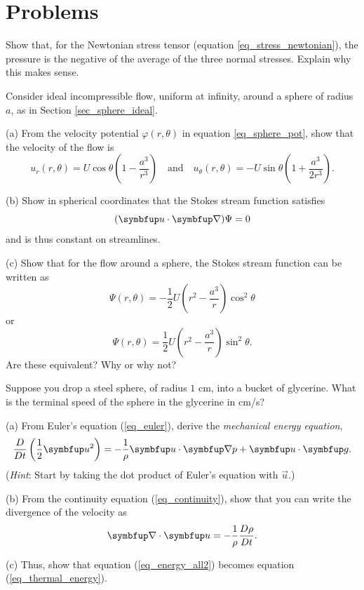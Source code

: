 \section*{Problems}
%

\begin{problem}
\label{prob_pressure} 
Show that, for the Newtonian stress tensor (equation \ref{eq_stress_newtonian}), the pressure is the negative of the average of the three normal stresses.  Explain why this makes sense.
\end{problem}

\begin{problem}
\label{prob_sphere} 
Consider ideal incompressible flow, uniform at infinity, around a sphere of radius $a$, as in Section \ref{sec_sphere_ideal}.

(a) From the velocity potential $\varphi(r, \theta)$ in equation \ref{eq_sphere_pot}, show that the velocity of the flow is
\[
u_r (r, \theta) = U \cos \theta \left( 1 - \frac{a^3}{r^3} \right) \quad \text{and} \quad u_\theta(r, \theta) = -U \sin \theta \left( 1 + \frac{a^3}{2r^3} \right).
\]

(b) Show in spherical coordinates that the Stokes stream function satisfies
\[
(\vec{u} \cdot \grad) \Psi = 0
\]
and is thus constant on streamlines.

(c) Show that for the flow around a sphere, the Stokes stream function can be written as
\[
\Psi (r, \theta) = -\frac{1}{2} U \left( r^2 - \frac{a^3}{r} \right) \cos^2 \theta
\]
or
\[
\Psi (r, \theta) = \frac{1}{2} U \left( r^2 - \frac{a^3}{r} \right) \sin^2 \theta.
\]
Are these equivalent?  Why or why not?
\end{problem}



\begin{problem}
\label{prob_terminal_vel} 
Suppose you drop a steel sphere, of radius $1$ cm, into a bucket of glycerine.  What is the terminal speed of the sphere in the glycerine in cm/s?
\end{problem}




\begin{problem}
\label{prob_energy_change} 

(a) From Euler's equation (\ref{eq_euler}), derive the \emph{mechanical energy equation},
\[
\frac{D}{Dt} \left( \frac{1}{2} \vec{u}^2 \right) = -\frac{1}{\rho} \vec{u} \cdot \grad p + \vec{u} \cdot \vec{g}.
\]
(\emph{Hint}: Start by taking the dot product of Euler's equation with $\vec{u}$.)

(b) From the continuity equation (\ref{eq_continuity}), show that you can write the divergence of the velocity as
\[
\grad \cdot \vec{u} = -\frac{1}{\rho} \frac{D\rho}{Dt}.
\]

(c) Thus, show that equation (\ref{eq_energy_all2}) becomes equation (\ref{eq_thermal_energy}).

\end{problem}


